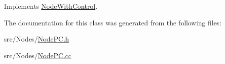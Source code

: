 Implements \hyperlink{class_node_with_control_a84df0beabbaed80e7da017d592480515}{Node\+With\+Control}.



The documentation for this class was generated from the following files\+:\begin{DoxyCompactItemize}
\item 
src/\+Nodes/\hyperlink{_node_p_c_8h}{Node\+P\+C.\+h}\item 
src/\+Nodes/\hyperlink{_node_p_c_8cc}{Node\+P\+C.\+cc}\end{DoxyCompactItemize}
